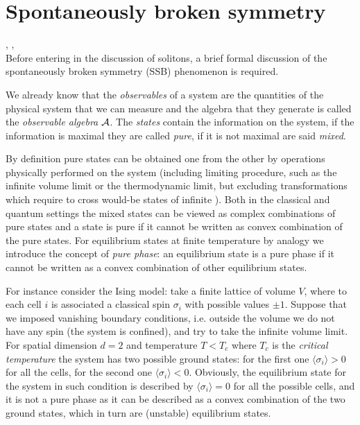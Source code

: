 \documentclass[../main/main.tex]{subfiles}
\begin{document}
\section{Spontaneously broken symmetry}\label{sec:SSB}

\cite[Chapter C.1]{Strocchi_1985}, \cite{Strocchi:2012}, \cite[Chapter 1]{Shifman:2012}\\

Before entering in the discussion of solitons, a brief formal discussion of the spontaneously broken symmetry (SSB) phenomenon is required. 

We already know that the \emph{observables} of a system are the quantities of the physical system that we can measure and the algebra that they generate is called the \emph{observable algebra} $\mathcal A$. The \emph{states} contain the information on the system, if the information is maximal they are called \emph{pure}, if it is not maximal are said \emph{mixed}. 

By definition pure states can be obtained one from the other by operations physically performed on the system (including limiting procedure, such as the infinite volume limit or the thermodynamic limit, but excluding transformations which require to cross would-be states of infinite ). Both in the classical and quantum settings the mixed states can be viewed as complex combinations of pure states and a state is pure if it cannot be written as convex combination of the pure states. 
For equilibrium states at finite temperature by analogy we introduce the concept of \emph{pure phase}: an equilibrium state is a pure phase if it cannot be written as a convex combination of other equilibrium states.

\skipline

For instance consider the Ising model: take a finite lattice of volume $V$, where to each cell $i$ is associated a classical spin $\sigma_i$ with possible values $\pm1$. Suppose that we imposed vanishing boundary conditions, i.e. outside the volume we do not have any spin (the system is confined), and try to take the infinite volume limit. For spatial dimension $d=2$ and temperature $T<T_c$ where $T_c$ is the \emph{critical temperature} the system has two possible ground states: for the first one $\langle\sigma_i\rangle>0$ for all the cells, for the second one $\langle\sigma_i\rangle<0$. Obviously, the equilibrium state for the system in such condition is described by $\langle\sigma_i\rangle =0$ for all the possible cells, and it is not a pure phase as it can be described as a convex combination of the two ground states, which in turn are (unstable) equilibrium states. 
\end{document}
